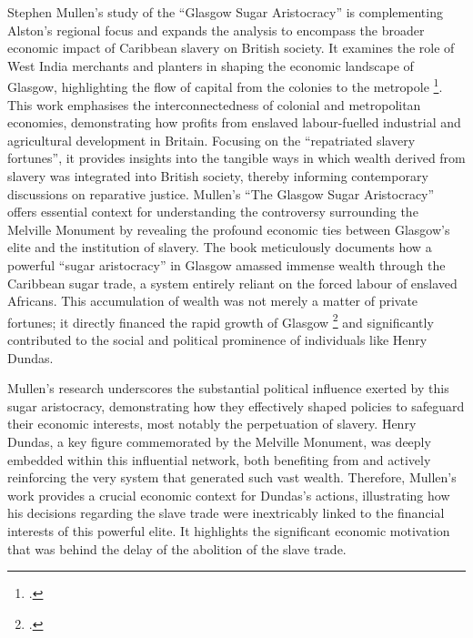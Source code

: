 \documentclass{scrartcl}
\begin{document}
Stephen Mullen's study of the ``Glasgow Sugar Aristocracy'' is complementing Alston's regional focus and expands the analysis to encompass the broader economic impact of Caribbean slavery on British society. It examines the role of West India merchants and planters in shaping the economic landscape of Glasgow, highlighting the flow of capital from the colonies to the metropole \footcite[``Perhaps so, but by including the
substantial estates of merchants with principal interests in Mauritius, and
others with no connection to Glasgow, Cooke’s estimations of the city’s
West India merchant capital were inflated by including East India fortunes
and returned sojourning wealth that improved other areas of Scotland.''][p.24]{mullen_2021}. This work emphasises the interconnectedness of colonial and metropolitan economies, demonstrating how profits from enslaved labour-fuelled industrial and agricultural development in Britain. Focusing on the ``repatriated slavery fortunes'', it provides insights into the tangible ways in which wealth derived from slavery was integrated into British society, thereby informing contemporary discussions on reparative justice.
Mullen's ``The Glasgow Sugar Aristocracy'' offers essential context for understanding the controversy surrounding the Melville Monument by revealing the profound economic ties between Glasgow's elite and the institution of slavery. The book meticulously documents how a powerful ``sugar aristocracy'' in Glasgow amassed immense wealth through the Caribbean sugar trade, a system entirely reliant on the forced labour of enslaved Africans. This accumulation of wealth was not merely a matter of private fortunes; it directly financed the rapid growth of Glasgow \footcite[``The irresistible
conclusion is that while all ranks of society benefited from the West India
elite’s charitable and philanthropic donations, Victorian Glasgow’s middle
class, especially those who had fallen on hard times, gained the most.''][p.290]{mullen_2021} and significantly contributed to the social and political prominence of individuals like Henry Dundas. 

Mullen's research underscores the substantial political influence exerted by this sugar aristocracy, demonstrating how they effectively shaped policies to safeguard their economic interests, most notably the perpetuation of slavery. Henry Dundas, a key figure commemorated by the Melville Monument, was deeply embedded within this influential network, both benefiting from and actively reinforcing the very system that generated such vast wealth. Therefore, Mullen's work provides a crucial economic context for Dundas's actions, illustrating how his decisions regarding the slave trade were inextricably linked to the financial interests of this powerful elite. It highlights the significant economic motivation that was behind the delay of the abolition of the slave trade.
\end{document}
